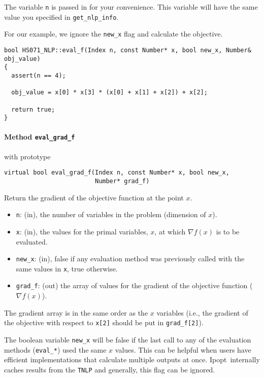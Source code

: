 \documentclass[10pt]{article}
\newcommand{\Ipopt}{{\sc Ipopt}}
\begin{document}
The variable {\tt n} is passed in for your convenience. This variable
will have the same value you specified in {\tt get\_nlp\_info}.

For our example, we ignore the {\tt new\_x} flag and calculate the objective.

\begin{footnotesize}
\begin{verbatim}
bool HS071_NLP::eval_f(Index n, const Number* x, bool new_x, Number& obj_value)
{
  assert(n == 4);

  obj_value = x[0] * x[3] * (x[0] + x[1] + x[2]) + x[2];

  return true;
}
\end{verbatim}
\end{footnotesize}

\paragraph{Method {\texttt{eval\_grad\_f}}} with prototype
\begin{verbatim}
virtual bool eval_grad_f(Index n, const Number* x, bool new_x, 
                         Number* grad_f)
\end{verbatim}
Return the gradient of the objective function at the point $x$.
\begin{itemize}
\item {\tt n}: (in), the number of variables in the problem (dimension of $x$). 
\item {\tt x}: (in), the values for the primal variables, $x$, at which
  $\nabla f(x)$ is to be evaluated.
\item {\tt new\_x}: (in), false if any evaluation method was previously called 
        with the same values in {\tt x}, true otherwise.
\item {\tt grad\_f}: (out) the array of values for the gradient of the 
        objective function ($\nabla f(x)$).
\end{itemize}

The gradient array is in the same order as the $x$ variables (i.e., the
gradient of the objective with respect to {\tt x[2]} should be put in
{\tt grad\_f[2]}).

The boolean variable {\tt new\_x} will be false if the last call to
any of the evaluation methods ({\tt eval\_*}) used the same $x$
values. This can be helpful when users have efficient implementations
that calculate multiple outputs at once. \Ipopt\ internally caches
results from the {\tt TNLP} and generally, this flag can be ignored.
\end{document}
